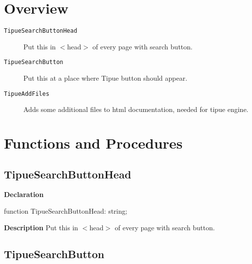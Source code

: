 \documentclass{report}
\newif\ifpdf
\begin{document}
\section{Overview}
\begin{description}
\item[\texttt{TipueSearchButtonHead}]Put this in {$<$}head{$>$} of every page with search button.
\item[\texttt{TipueSearchButton}]Put this at a place where Tipue button should appear.
\item[\texttt{TipueAddFiles}]Adds some additional files to html documentation, needed for tipue engine.
\end{description}
\section{Functions and Procedures}
\ifpdf
\subsection*{\large{\textbf{TipueSearchButtonHead}}\normalsize\hspace{1ex}\hrulefill}
\else
\subsection*{TipueSearchButtonHead}
\fi
\label{PasDoc_Tipue-TipueSearchButtonHead}
\begin{list}{}{
\setlength{\itemindent}{0cm}
\setlength{\listparindent}{0cm}
\setlength{\leftmargin}{\evensidemargin}
\addtolength{\leftmargin}{\tmplength}
\settowidth{\labelsep}{X}
\addtolength{\leftmargin}{\labelsep}
\setlength{\labelwidth}{\tmplength}
}
\item[\textbf{Declaration}\hfill]
\ifpdf
\begin{flushleft}
\fi
\begin{ttfamily}
function TipueSearchButtonHead: string;\end{ttfamily}

\ifpdf
\end{flushleft}
\fi

\par
\item[\textbf{Description}]
Put this in {$<$}head{$>$} of every page with search button.

\end{list}
\ifpdf
\subsection*{\large{\textbf{TipueSearchButton}}\normalsize\hspace{1ex}\hrulefill}
\else
\end{document}
